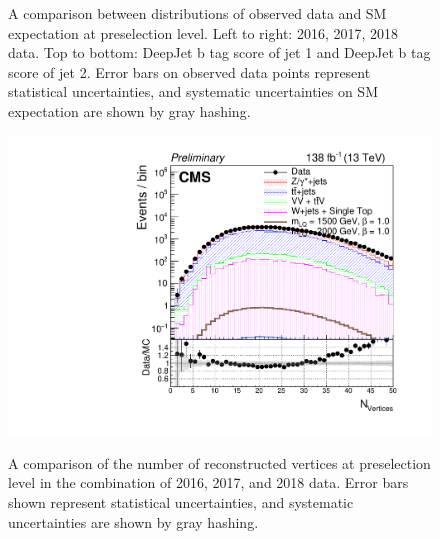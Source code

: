 \begin{figure}[H]
       \caption{A comparison between distributions of observed data and SM expectation at preselection level. Left to right: 2016, 2017, 2018 data. Top to bottom: DeepJet b tag score of jet 1 and DeepJet b tag score of jet 2. Error bars on observed data points represent statistical uncertainties, and systematic uncertainties on SM expectation are shown by gray hashing.}
    \label{figapp:preselbtag}
\end{figure}


\begin{figure}[H]
       \centering
       {\includegraphics[width=.49\textwidth]{Images/Analysis/Results_combined_Unblinded/Plots/Preselection/BasicLQ_uujj_GoodVertexCount_standard.pdf}}
       \caption{A comparison of the number of reconstructed vertices at preselection level in the combination of 2016, 2017, and 2018 data. Error bars shown represent statistical uncertainties, and systematic uncertainties are shown by gray hashing.}
       \label{fig:vertexCombined}
\end{figure}

